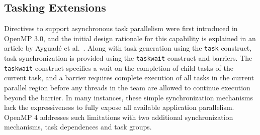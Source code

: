 \subsection{Tasking Extensions}
\label{sub:tasking}



Directives to support asynchronous task parallelism were first introduced in OpenMP 3.0, and the initial design rationale for this capability is explained in an article by Ayguad\'{e} et al.~\cite{ayguade2009tpds}.  Along with task generation using the \texttt{task} construct, task synchronization is provided using the \texttt{taskwait} construct and barriers.  The \texttt{taskwait} construct specifies a wait on the completion of child tasks of the current task, and a barrier requires complete execution of all tasks in the current parallel region before any threads in the team are allowed to continue execution beyond the barrier.  In many instances, these simple synchronization mechanisms lack the expressiveness to fully expose all available application parallelism.  OpenMP 4 addresses such limitations with two additional synchronization mechanisms, task dependences and task groups.


